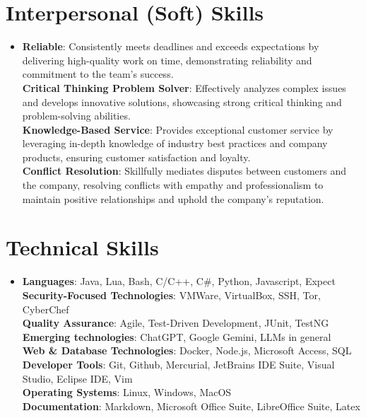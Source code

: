 \documentclass[letterpaper,11pt]{article}
\begin{document}
\section{Interpersonal (Soft) Skills}
\begin{itemize}[leftmargin=0.15in, label={}]
  \item{
        \textbf{Reliable}{: Consistently meets deadlines and exceeds expectations by delivering high-quality work on time, demonstrating reliability and commitment to the team's success.} \\
        \textbf{Critical Thinking Problem Solver}{: Effectively analyzes complex issues and develops innovative solutions, showcasing strong critical thinking and problem-solving abilities.} \\
        \textbf{Knowledge-Based Service}{: Provides exceptional customer service by leveraging in-depth knowledge of industry best practices and company products, ensuring customer satisfaction and loyalty.} \\
        \textbf{Conflict Resolution}{: Skillfully mediates disputes between customers and the company, resolving conflicts with empathy and professionalism to maintain positive relationships and uphold the company's reputation.} \\

    }
\end{itemize}
\vspace{-10pt}



%
\section{Technical Skills}
\begin{itemize}[leftmargin=0.15in, label={}]
  \item{
        \textbf{Languages}{: Java, Lua, Bash, C/C++, C\#, Python, Javascript, Expect} \\
        \textbf{Security-Focused Technologies}{: VMWare, VirtualBox, SSH, Tor, CyberChef} \\
        \textbf{Quality Assurance}{: Agile, Test-Driven Development, JUnit, TestNG } \\
        \textbf{Emerging technologies}{: ChatGPT, Google Gemini, LLMs in general } \\
        \textbf{Web \& Database Technologies}{: Docker, Node.js, Microsoft Access, SQL} \\
        \textbf{Developer Tools}{: Git, Github, Mercurial, JetBrains IDE Suite, Visual Studio, Eclipse IDE, Vim} \\
        \textbf{Operating Systems}{: Linux, Windows, MacOS } \\
        \textbf{Documentation}{: Markdown, Microsoft Office Suite, LibreOffice Suite, Latex } \\

        }
\end{itemize}
\vspace{-10pt}
\end{document}

